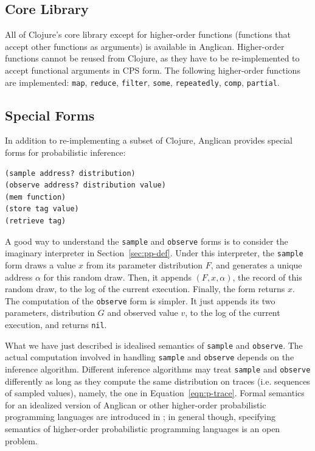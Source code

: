 \documentclass[sigconf]{acmart}
\begin{document}
\subsection{Core Library}
\label{sec:core}

All of Clojure's core library except for higher-order functions
(functions that accept other functions as arguments) is
available in Anglican. Higher-order functions cannot be reused
from Clojure, as they have to be re-implemented to accept
functional arguments in CPS form. The following higher-order
functions are implemented: \texttt{map}, \texttt{reduce},
\texttt{filter}, \texttt{some}, \texttt{repeatedly},
\texttt{comp}, \texttt{partial}.

\subsection{Special Forms}

 In addition to re-implementing a subset of Clojure, Anglican
provides special forms for probabilistic inference:
\begin{lstlisting}[style=default]
(sample address? distribution)
(observe address? distribution value)
(mem function)
(store tag value)
(retrieve tag)
\end{lstlisting}

A good way to understand the \texttt{sample} and \texttt{observe} forms
is to consider the imaginary interpreter in Section~\ref{sec:pp-def}.
Under this interpreter, the \texttt{sample} form draws a value $x$ from 
its parameter distribution $F$, and 
generates a unique address $\alpha$ for this random draw.
Then, it appends $(F, x, \alpha)$, the record of this random
draw, to the log of the current execution. Finally, the
form returns $x$. The computation of the \texttt{observe} form is
simpler. It just appends its two parameters, distribution $G$
and observed value $v$, to the log of the current execution,
and returns \texttt{nil}.

What we have just described is idealised semantics 
of \texttt{sample} and \texttt{observe}. The actual computation 
involved in handling \texttt{sample} and \texttt{observe} 
depends on the inference algorithm. Different inference algorithms may treat
\texttt{sample} and \texttt{observe} differently as long as they
compute the same distribution on traces (i.e. sequences of sampled values), 
namely, the one in Equation~\ref{eqn:p-trace}.
Formal semantics for an idealized version
of Anglican or other higher-order probabilistic programming languages are introduced 
in \cite{SYH+16,BorgstromLGS16}; in general though,
specifying semantics of higher-order probabilistic programming
languages is an open problem.
\end{document}
